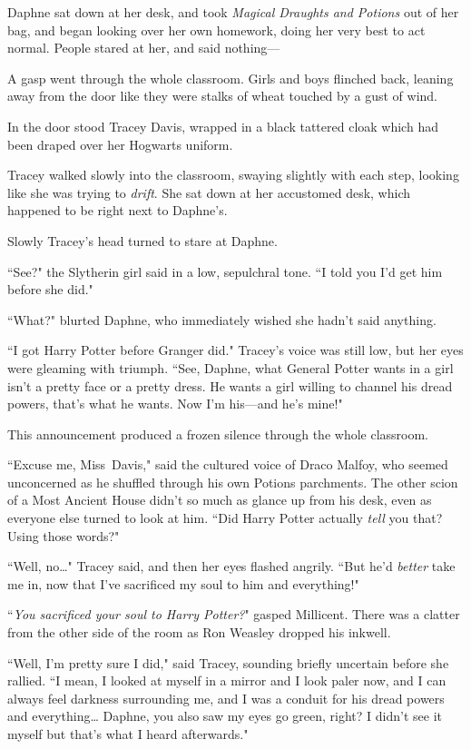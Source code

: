 Daphne sat down at her desk, and took \emph{Magical Draughts and Potions} out of her bag, and began looking over her own homework, doing her very best to act normal. People stared at her, and said nothing—

A gasp went through the whole classroom. Girls and boys flinched back, leaning away from the door like they were stalks of wheat touched by a gust of wind.

In the door stood Tracey Davis, wrapped in a black tattered cloak which had been draped over her Hogwarts uniform.

Tracey walked slowly into the classroom, swaying slightly with each step, looking like she was trying to \emph{drift}. She sat down at her accustomed desk, which happened to be right next to Daphne's.

Slowly Tracey's head turned to stare at Daphne.

``See?" the Slytherin girl said in a low, sepulchral tone. ``I told you I'd get him before she did."

``What?" blurted Daphne, who immediately wished she hadn't said anything.

``I got Harry Potter before Granger did." Tracey's voice was still low, but her eyes were gleaming with triumph. ``See, Daphne, what General Potter wants in a girl isn't a pretty face or a pretty dress. He wants a girl willing to channel his dread powers, that's what he wants. Now I'm his—and he's mine!"

This announcement produced a frozen silence through the whole classroom.

``Excuse me, Miss~Davis," said the cultured voice of Draco Malfoy, who seemed unconcerned as he shuffled through his own Potions parchments. The other scion of a Most Ancient House didn't so much as glance up from his desk, even as everyone else turned to look at him. ``Did Harry Potter actually \emph{tell} you that? Using those words?"

``Well, no{\ldots}" Tracey said, and then her eyes flashed angrily. ``But he'd \emph{better} take me in, now that I've sacrificed my soul to him and everything!"

``\emph{You sacrificed your soul to Harry Potter?}" gasped Millicent. There was a clatter from the other side of the room as Ron Weasley dropped his inkwell.

``Well, I'm pretty sure I did," said Tracey, sounding briefly uncertain before she rallied. ``I mean, I looked at myself in a mirror and I look paler now, and I can always feel darkness surrounding me, and I was a conduit for his dread powers and everything{\ldots} Daphne, you also saw my eyes go green, right? I didn't see it myself but that's what I heard afterwards."

